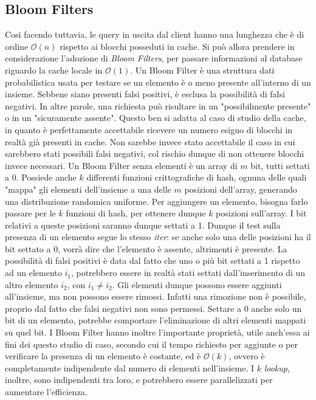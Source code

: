 	\subsection{Bloom Filters}
	

		Cosi facendo tuttavia, le query in uscita dal client hanno una lunghezza che è di ordine $\mathcal{O}(n)$ rispetto ai blocchi posseduti in cache. Si può allora prendere in considerazione l'adozione di \textit{Bloom Filters}, per passare informazioni al database riguardo la cache locale in $\mathcal{O}(1)$.
		Un Bloom Filter è una struttura dati probabilistica usata per testare se un elemento è o meno presente all'interno di un insieme. Sebbene siano presenti falsi positivi, è esclusa la possibilità di falsi negativi. In altre parole, una richiesta può risultare in un "possibilmente presente" o in un "sicuramente assente". Questo ben si adatta al caso di studio della cache, in quanto è perfettamente accettabile ricevere un numero esiguo di blocchi in realtà già presenti in cache. Non sarebbe invece stato accettabile il caso in cui sarebbero stati possibili falsi negativi, col rischio dunque di non ottenere blocchi invece necessari.
		Un Bloom Filter senza elementi è un array di $ m $ bit, tutti settati a 0. Possiede anche $ k $ differenti funzioni crittografiche di hash, ognuna delle quali "mappa" gli elementi dell'insieme a una delle $ m $ posizioni dell'array, generando una distribuzione randomica uniforme. Per aggiungere un elemento, bisogna farlo passare per le $ k $ funzioni di hash, per ottenere dunque $ k $ posizioni sull'array. I bit relativi a queste posizioni saranno dunque settati a 1. Dunque il test sulla presenza di un elemento segue lo stesso \textit{iter}: se anche solo una delle posizioni ha il bit settato a 0, vorrà dire che l'elemento è assente, altrimenti è presente. La possibilità di falsi positivi è data dal fatto che uno o più bit settati a 1 rispetto ad un elemento $ i_{1} $, potrebbero essere in realtà stati settati dall'inserimento di un altro elemento $ i_{2} $, con $ i_{1}\ne i_{2} $.	
		Gli elementi dunque possono essere aggiunti all'insieme, ma non possono essere rimossi. Infatti una rimozione non è possibile, proprio dal fatto che falsi negativi non sono permessi. Settare a 0 anche solo un bit di un elemento, potrebbe comportare l'eliminazione di altri elementi mappati su quel bit.
		I Bloom Filter hanno inoltre l'importante proprietà, utile anch'essa ai fini dei questo studio di caso, secondo cui il tempo richiesto per aggiunte o per verificare la presenza di un elemento è costante, ed è $\mathcal{O}(k)$, ovvero è completamente indipendente dal numero di elementi nell'insieme. I $ k $ \textit{lookup}, inoltre, sono indipendenti tra loro, e potrebbero essere parallelizzati per aumentare l'efficienza.
		
